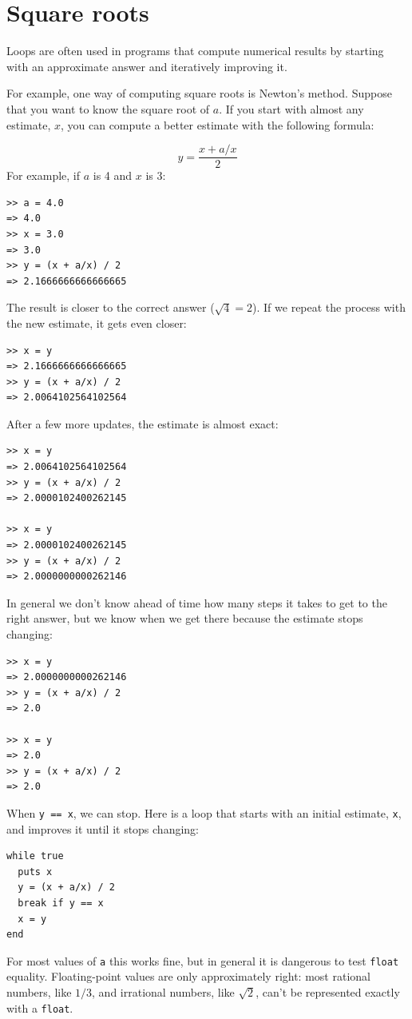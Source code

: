 \documentclass[10pt]{book}
\begin{document}
\section{Square roots}
\label{squareroot}

Loops are often used in programs that compute
numerical results by starting with an approximate answer and
iteratively improving it.

For example, one way of computing square roots is Newton's method.
Suppose that you want to know the square root of $a$.  If you start
with almost any estimate, $x$, you can compute a better
estimate with the following formula:

\[ y = \frac{x + a/x}{2} \]
%
For example, if $a$ is 4 and $x$ is 3:

\begin{verbatim}
>> a = 4.0
=> 4.0
>> x = 3.0
=> 3.0
>> y = (x + a/x) / 2
=> 2.1666666666666665
\end{verbatim}
%
The result is closer to the correct answer ($\sqrt{4} = 2$).  If we
repeat the process with the new estimate, it gets even closer:

\begin{verbatim}
>> x = y
=> 2.1666666666666665
>> y = (x + a/x) / 2
=> 2.0064102564102564
\end{verbatim}
%
After a few more updates, the estimate is almost exact:

\begin{verbatim}
>> x = y
=> 2.0064102564102564
>> y = (x + a/x) / 2
=> 2.0000102400262145

>> x = y
=> 2.0000102400262145
>> y = (x + a/x) / 2
=> 2.0000000000262146
\end{verbatim}
%
In general we don't know ahead of time how many steps it takes
to get to the right answer, but we know when we get there
because the estimate
stops changing:

\begin{verbatim}
>> x = y
=> 2.0000000000262146
>> y = (x + a/x) / 2
=> 2.0

>> x = y
=> 2.0
>> y = (x + a/x) / 2
=> 2.0
\end{verbatim}
%
When {\tt y == x}, we can stop.  Here is a loop that starts
with an initial estimate, {\tt x}, and improves it until it
stops changing:

\begin{verbatim}
while true
  puts x
  y = (x + a/x) / 2
  break if y == x
  x = y
end
\end{verbatim}
%
For most values of {\tt a} this works fine, but in general it is
dangerous to test {\tt float} equality.
Floating-point values are only approximately right:
most rational numbers, like $1/3$, and irrational numbers, like
$\sqrt{2}$, can't be represented exactly with a {\tt float}.
\end{document}
